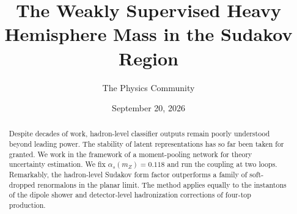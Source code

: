 \documentclass[11pt]{article}
\title{The Weakly Supervised Heavy Hemisphere Mass in the Sudakov Region}
\author{The Physics Community}
\date{September 20, 2026}
\begin{document}
\maketitle
\begin{abstract}
Despite decades of work, hadron-level classifier outputs remain poorly
understood beyond leading power. The stability of latent representations
has so far been taken for granted. We work in the framework of a
moment-pooling network for theory uncertainty estimation. We fix
$\alpha_s(m_Z) = 0.118$ and run the coupling at two loops. Remarkably,
the hadron-level Sudakov form factor outperforms a family of
soft-dropped renormalons in the planar limit. The method applies equally
to the instantons of the dipole shower and detector-level hadronization
corrections of four-top production.
\end{abstract}
\tableofcontents




\nocite{*}


\end{document}
